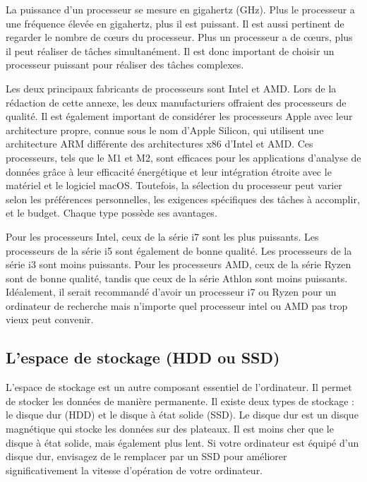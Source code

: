 \documentclass[
  letterpaper,
  DIV=11,
  numbers=noendperiod]{scrreprt}
\begin{document}
La puissance d'un processeur se mesure en gigahertz (GHz). Plus le
processeur a une fréquence élevée en gigahertz, plus il est puissant. Il
est aussi pertinent de regarder le nombre de cœurs du processeur. Plus
un processeur a de cœurs, plus il peut réaliser de tâches simultanément.
Il est donc important de choisir un processeur puissant pour réaliser
des tâches complexes.

Les deux principaux fabricants de processeurs sont Intel et AMD. Lors de
la rédaction de cette annexe, les deux manufacturiers offraient des
processeurs de qualité. Il est également important de considérer les
processeurs Apple avec leur architecture propre, connue sous le nom
d'Apple Silicon, qui utilisent une architecture ARM différente des
architectures x86 d'Intel et AMD. Ces processeurs, tels que le M1 et M2,
sont efficaces pour les applications d'analyse de données grâce à leur
efficacité énergétique et leur intégration étroite avec le matériel et
le logiciel macOS. Toutefois, la sélection du processeur peut varier
selon les préférences personnelles, les exigences spécifiques des tâches
à accomplir, et le budget. Chaque type possède ses avantages.

Pour les processeurs Intel, ceux de la série i7 sont les plus puissants.
Les processeurs de la série i5 sont également de bonne qualité. Les
processeurs de la série i3 sont moins puissants. Pour les processeurs
AMD, ceux de la série Ryzen sont de bonne qualité, tandis que ceux de la
série Athlon sont moins puissants. Idéalement, il serait recommandé
d'avoir un processeur i7 ou Ryzen pour un ordinateur de recherche mais
n'importe quel processeur intel ou AMD pas trop vieux peut convenir.

\subsection{L'espace de stockage (HDD ou
SSD)}\label{lespace-de-stockage-hdd-ou-ssd}

L'espace de stockage est un autre composant essentiel de l'ordinateur.
Il permet de stocker les données de manière permanente. Il existe deux
types de stockage : le disque dur (HDD) et le disque à état solide
(SSD). Le disque dur est un disque magnétique qui stocke les données sur
des plateaux. Il est moins cher que le disque à état solide, mais
également plus lent. Si votre ordinateur est équipé d'un disque dur,
envisagez de le remplacer par un SSD pour améliorer significativement la
vitesse d'opération de votre ordinateur.
\end{document}
